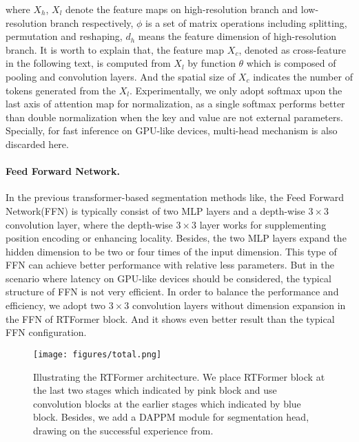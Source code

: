 \documentclass{article}
\begin{document}
where $X_h$, $X_l$ denote the feature maps on high-resolution branch and low-resolution branch respectively, $\phi$ is a set of matrix operations including splitting, permutation and reshaping, $d_h$ means the feature dimension of high-resolution branch. It is worth to explain that, the feature map $X_c$, denoted as cross-feature in the following text, is computed from $X_l$ by function $\theta$ which is composed of pooling and convolution layers. And the spatial size of $X_c$ indicates the number of tokens generated from the $X_l$. Experimentally, we only adopt softmax upon the last axis of attention map for normalization, as a single softmax performs better than double normalization when the key and value are not external parameters. Specially, for fast inference on GPU-like devices, multi-head mechanism is also discarded here.

\vspace{-2mm}
\paragraph{Feed Forward Network.}

In the previous transformer-based segmentation methods like\cite{xie2021segformer, yuan2021hrformer}, the Feed Forward Network(FFN) is typically consist of two MLP layers and a depth-wise $3\times 3$ convolution layer, where the depth-wise $3\times 3$ layer works for supplementing position encoding or enhancing locality. Besides, the two MLP layers expand the hidden dimension to be two or four times of the input dimension. This type of FFN can achieve better performance with relative less parameters. But in the scenario where latency on GPU-like devices should be considered, the typical structure of FFN is not very efficient. In order to balance the performance and efficiency, we adopt two $3\times 3$ convolution layers without dimension expansion in the FFN of RTFormer block. And it shows even better result than the typical FFN configuration.

\begin{figure}
\texttt{[image: figures/total.png]}
    \caption{Illustrating the RTFormer architecture. We place RTFormer block at the last two stages which indicated by pink block and use convolution blocks at the earlier stages which indicated by blue block. Besides, we add a DAPPM module for segmentation head, drawing on the successful experience from\cite{hong2021deep}.}
    \label{fig:RTFormer}
\end{figure}
\end{document}

